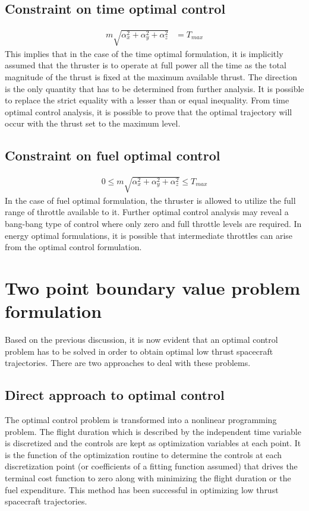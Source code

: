 \subsection{Constraint on time optimal control}
\begin{align}
	m\sqrt{\alpha_x^2+\alpha_y^2+\alpha_z^2}&=T_{max}
\end{align}
This implies that in the case of the time optimal formulation, it is implicitly assumed that the thruster is to operate at full power all the time as the total magnitude of the thrust is fixed at the maximum available thrust. The direction is the only quantity that has to be determined from further analysis. It is possible to replace the strict equality with a lesser than or equal inequality. From time optimal control analysis, it is possible to prove that the optimal trajectory will occur with the thrust set to the maximum level.
\subsection{Constraint on fuel optimal control}
\begin{align}
	0\leq m\sqrt{\alpha_x^2+\alpha_y^2+\alpha_z^2}\leq T_{max}
\end{align}
In the case of fuel optimal formulation, the thruster is allowed to utilize the full range of throttle available to it. Further optimal control analysis may reveal a bang-bang type of control where only zero and full throttle levels are required. In energy optimal formulations, it is possible that intermediate throttles can arise from the optimal control formulation.

\section{Two point boundary value problem formulation}
Based on the previous discussion, it is now evident that an optimal control problem has to be solved in order to obtain optimal low thrust spacecraft trajectories. There are two approaches to deal with these problems.
\subsection{Direct approach to optimal control}
The optimal control problem is transformed into a nonlinear programming problem. The flight duration which is described by the independent time variable is discretized and the controls are kept as optimization variables at each point. It is the function of the optimization routine to determine the controls at each discretization point (or coefficients of a fitting function assumed) that drives the terminal cost function to zero along with minimizing the flight duration or the fuel expenditure. This method has been successful in optimizing low thrust spacecraft trajectories.
